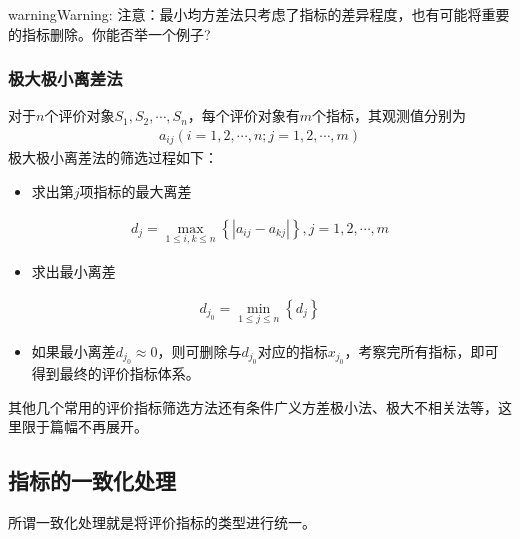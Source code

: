 \documentclass[letterpaper,10pt,english]{sphinxmanual}
\begin{document}
\begin{sphinxadmonition}{warning}{Warning:}
注意：最小均方差法只考虑了指标的差异程度，也有可能将重要的指标删除。你能否举一个例子?
\end{sphinxadmonition}


\subsubsection{极大极小离差法}
\label{\detokenize{docs/evaluation_model:id6}}
对于\(n\)个评价对象\(S_{1}, S_{2}, \cdots, S_{n}\)，每个评价对象有\(m\)个指标，其观测值分别为
\begin{equation*}
\begin{split}
a_{i j}(i=1,2, \cdots, n ; j=1,2, \cdots, m)
\end{split}
\end{equation*}
极大极小离差法的筛选过程如下：
\begin{itemize}
\item {} 
求出第\(j\)项指标的最大离差

\end{itemize}
\begin{equation*}
\begin{split}
d_{j}=\max _{1 \leq i,k \leq n}\left\{\left|a_{i j}-a_{k j}\right|\right\}, j=1,2, \cdots, m
\end{split}
\end{equation*}\begin{itemize}
\item {} 
求出最小离差

\end{itemize}
\begin{equation*}
\begin{split}
d_{j_{0}}=\min _{1 \leq j \leq n}\left\{d_{j}\right\}
\end{split}
\end{equation*}\begin{itemize}
\item {} 
如果最小离差\(d_{j_{0}} \approx 0\)，则可删除与\(d_{j_{0}}\)对应的指标\(x_{j_{0}}\)，考察完所有指标，即可得到最终的评价指标体系。

\end{itemize}

其他几个常用的评价指标筛选方法还有条件广义方差极小法、极大不相关法等，这里限于篇幅不再展开。


\subsection{指标的一致化处理}
\label{\detokenize{docs/evaluation_model:content-choose-2}}\label{\detokenize{docs/evaluation_model:id7}}
所谓一致化处理就是将评价指标的类型进行统一。
\end{document}
